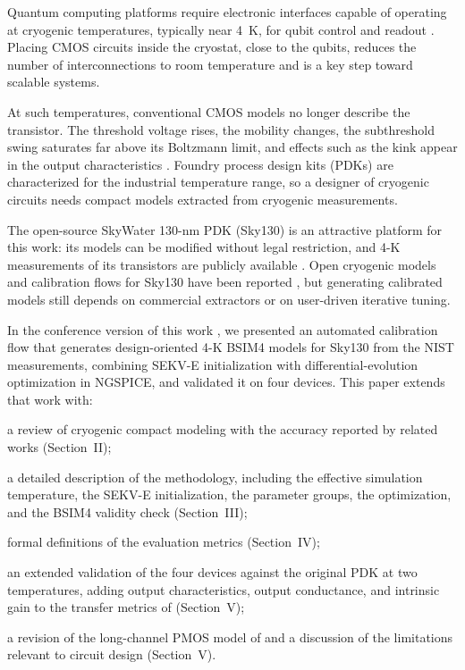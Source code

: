 \documentclass[a4paper,10pt,twoside,twocolumn,final]{JICS_LaTexGuidelines} %
\newenvironment{compactitem}{%
	\begin{list}{\textbullet}{%
		\setlength{\leftmargin}{1.2em}\setlength{\labelwidth}{0.7em}\setlength{\labelsep}{0.5em}%
		\setlength{\itemsep}{1pt}\setlength{\parsep}{0pt}\setlength{\topsep}{3pt}\setlength{\partopsep}{0pt}}}%
	{\end{list}}
\begin{document}
Quantum computing platforms require electronic interfaces capable of operating at cryogenic temperatures, typically near 4~K, for qubit control and readout \cite{b1,b3,b16}. Placing CMOS circuits inside the cryostat, close to the qubits, reduces the number of interconnections to room temperature and is a key step toward scalable systems.

At such temperatures, conventional CMOS models no longer describe the transistor. The threshold voltage rises, the mobility changes, the subthreshold swing saturates far above its Boltzmann limit, and effects such as the kink appear in the output characteristics \cite{b4,b23}. Foundry process design kits (PDKs) are characterized for the industrial temperature range, so a designer of cryogenic circuits needs compact models extracted from cryogenic measurements.

The open-source SkyWater 130-nm PDK (Sky130) \cite{b10} is an attractive platform for this work: its models can be modified without legal restriction, and 4-K measurements of its transistors are publicly available \cite{b15,b16}. Open cryogenic models and calibration flows for Sky130 have been reported \cite{b6,b7,b21}, but generating calibrated models still depends on commercial extractors or on user-driven iterative tuning.

In the conference version of this work \cite{b17}, we presented an automated calibration flow that generates design-oriented 4-K BSIM4 models for Sky130 from the NIST measurements, combining SEKV-E initialization with differential-evolution optimization in NGSPICE, and validated it on four devices. This paper extends that work with:
\begin{compactitem}
	\item a review of cryogenic compact modeling with the accuracy reported by related works (Section~II);
	\item a detailed description of the methodology, including the effective simulation temperature, the SEKV-E initialization, the parameter groups, the optimization, and the BSIM4 validity check (Section~III);
	\item formal definitions of the evaluation metrics (Section~IV);
	\item an extended validation of the four devices against the original PDK at two temperatures, adding output characteristics, output conductance, and intrinsic gain to the transfer metrics of \cite{b17} (Section~V);
	\item a revision of the long-channel PMOS model of \cite{b17} and a discussion of the limitations relevant to circuit design (Section~V).
\end{compactitem}
\end{document}
